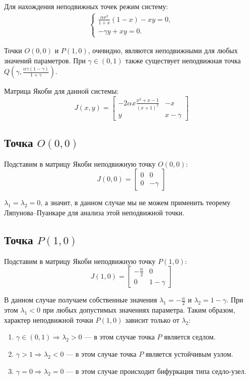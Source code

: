 \documentclass[11pt]{article}
\begin{document}
Для нахождения неподвижных точек режим систему:
\begin{gather}
\left\{ \begin{aligned}
\frac{\alpha x^2}{1 + x}(1 - x) - xy = 0, \\
-\gamma y + xy = 0.
\end{aligned} \right.
\end{gather}

Точки $O(0, 0)$ и $P(1, 0)$, очевидно, являются неподвижными для любых значений параметров. При $\gamma \in (0, 1)$ также существует неподвижная точка $Q\left(\gamma, \frac{\alpha\gamma(1 - \gamma)}{1 + \gamma}\right)$.

Матрица Якоби для данной системы:
$$
J(x, y) = \left[ \begin{array}{ccc}
-2\alpha x \frac{x^2 + x - 1}{(x+1)^2} & -x \\[0.5em]
y & x - \gamma
\end{array} \right]
$$

\subsection{Точка $O(0, 0)$}

Подставим в матрицу Якоби неподвижную точку $O(0, 0)$:
$$
J(0, 0) = \left[ \begin{array}{ccc}
0 & 0 \\[0.5em]
0 & -\gamma
\end{array} \right]
$$

$\lambda_1 = \lambda_2 = 0$, а значит, в данном случае мы не можем применить теорему Ляпунова--Пуанкаре для анализа этой неподвижной точки.

\subsection{Точка $P(1, 0)$}

Подставим в матрицу Якоби неподвижную точку $P(1, 0)$:
$$
J(1, 0) = \left[ \begin{array}{ccc}
-\frac{\alpha}{2} & 0 \\[0.5em]
0 & 1 - \gamma
\end{array} \right]
$$

В данном случае получаем собственные значения $\lambda_1 = -\frac{\alpha}{2}$ и $\lambda_2 = 1 - \gamma$. При этом $\lambda_1 < 0$ при любых допустимых значениях параметра. Таким образом, характер неподвижной точки $P(1, 0)$ зависит только от $\lambda_2$:
\begin{enumerate}
\item
$\gamma \in (0, 1) \Rightarrow \lambda_2 > 0$ --- в этом случае точка $P$ является седлом.
\item
$\gamma > 1 \Rightarrow \lambda_2 < 0$ --- в этом случае точка $P$ является устойчивым узлом.
\item
$\gamma = 0 \Rightarrow \lambda_2 = 0$ --- в этом случае происходит бифуркация типа седло-узел.
\end{enumerate}
\end{document}

